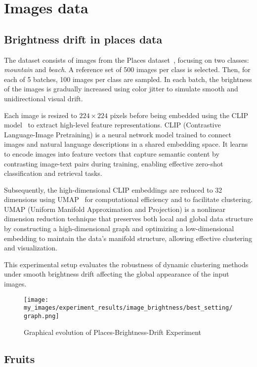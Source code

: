 \section{Images data}\label{sec:images_data}

\subsection{Brightness drift in places data}\label{subsec:brightness}

The dataset consists of images from the Places dataset~\cite{placesdataset},
focusing on two classes: \emph{mountain} and \emph{beach}. A reference set of
500 images per class is selected. Then, for each of 5 batches, 100 images per
class are sampled. In each batch, the brightness of the images is gradually
increased using color jitter to simulate smooth and unidirectional visual
drift.

Each image is resized to $224 \times 224$ pixels before being embedded using
the CLIP model~\cite{clip} to extract high-level feature representations. CLIP
(Contrastive Language-Image Pretraining) is a neural network model trained to
connect images and natural language descriptions in a shared embedding space.
It learns to encode images into feature vectors that capture semantic content
by contrasting image-text pairs during training, enabling effective zero-shot
classification and retrieval tasks.

Subsequently, the high-dimensional CLIP embeddings are reduced to 32 dimensions
using UMAP~\cite{umap} for computational efficiency and to facilitate
clustering. UMAP (Uniform Manifold Approximation and Projection) is a nonlinear
dimension reduction technique that preserves both local and global data
structure by constructing a high-dimensional graph and optimizing a
low-dimensional embedding to maintain the data's manifold structure, allowing
effective clustering and visualization.

This experimental setup evaluates the robustness of dynamic clustering methods
under smooth brightness drift affecting the global appearance of the input
images.

\begin{figure}[h]
      \centering
      \texttt{[image: my\_images/experiment\_results/image\_brightness/best\_setting/graph.png]}
      \caption{Graphical evolution of Places-Brightness-Drift Experiment}
\end{figure}

\subsection{Fruits}\label{subsec:fruits}

